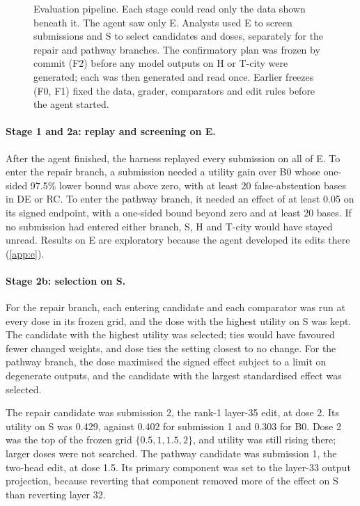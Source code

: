 \begin{figure}[t]
\caption{Evaluation pipeline. Each stage could read only the data shown beneath it. The agent saw only E. Analysts
used E to screen submissions and S to select candidates and doses, separately for the repair and pathway branches.
The confirmatory plan was frozen by commit (F2) before any model outputs on H or T-city were generated; each was then
generated and read once. Earlier freezes (F0, F1) fixed the data, grader, comparators and edit rules before the agent
started.}
\label{fig:pipeline}
\end{figure}

\paragraph{Stage 1 and 2a: replay and screening on E.}
After the agent finished, the harness replayed every submission on all of E. To enter the repair branch, a submission
needed a utility gain over B0 whose one-sided 97.5\% lower bound was above zero, with at least 20 false-abstention
bases in DE or RC. To enter the pathway branch, it needed an effect of at least 0.05 on its signed endpoint, with a
one-sided bound beyond zero and at least 20 bases. If no submission had entered either branch, S, H and T-city would
have stayed unread. Results on E are exploratory because the agent developed its edits there (\cref{app:e}).

\paragraph{Stage 2b: selection on S.}
For the repair branch, each entering candidate and each comparator was run at every dose in its frozen grid, and the
dose with the highest utility on S was kept. The candidate with the highest utility was selected; ties would have
favoured fewer changed weights, and dose ties the setting closest to no change. For the pathway branch, the dose
maximised the signed effect subject to a limit on degenerate outputs, and the candidate with the largest
standardised effect was selected.

The repair candidate was submission 2, the rank-1 layer-35 edit, at dose 2. Its utility on S was 0.429, against
0.402 for submission 1 and 0.303 for B0. Dose 2 was the top of the frozen grid $\{0.5, 1, 1.5, 2\}$, and utility was
still rising there; larger doses were not searched. The pathway candidate was submission 1, the two-head edit, at
dose 1.5. Its primary component was set to the layer-33 output projection, because reverting that component removed
more of the effect on S than reverting layer 32.

